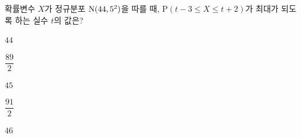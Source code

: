 확률변수 $X$가 정규분포 $\mathrm{N}(44{,}\mkern3mu\mathopen{}5^2)$을 따를 때, $\mathrm{P}(t-3\le X\le t+2)$가 최대가 되도록 하는 실수 $t$의 값은?
\begin{choices32}{\rule[-3ex]{0pt}{8ex}$44$}{\rule[-3ex]{0pt}{8ex}$\dfrac{89}{2}$}{\rule[-3ex]{0pt}{8ex}$45$}{\rule[-3ex]{0pt}{8ex}$\dfrac{91}{2}$}{\rule[-3ex]{0pt}{8ex}$46$}\end{choices32}
